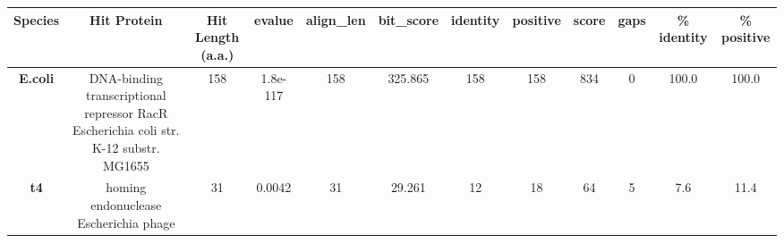 \begin{tabular}{|c|c|c|c|c|c|c|c|c|c|c|c|} \hline
\textbf{Species} & \textbf{Hit Protein} & \textbf{Hit Length (a.a.)} & \textbf{evalue} & \textbf{align\_len} & \textbf{bit\_score} & \textbf{identity} & \textbf{positive} & \textbf{score} & \textbf{gaps} & \textbf{\% identity} & \textbf{\% positive} \\ \hline
\textbf{E.coli} & DNA-binding transcriptional repressor RacR Escherichia coli str. K-12 substr. MG1655 & 158 & 1.8e-117 & 158 & 325.865 & 158 & 158 & 834 & 0 & 100.0 & 100.0\\
\textbf{t4} & homing endonuclease Escherichia phage  & 31 & 0.0042 & 31 & 29.261 & 12 & 18 & 64 & 5 & 7.6 & 11.4\\
\hline \end{tabular}
